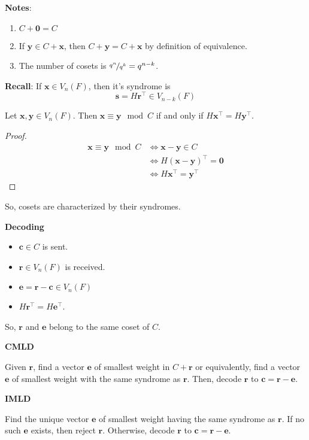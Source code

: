 \textbf{Notes}:
\begin{enumerate}[(1)]
    \item $ C+\bm{0}=C $
    \item If $ \bm{y}\in C+\bm{x} $, then $ C+\bm{y}=C+\bm{x} $ by definition
    of equivalence.
    \item The number of cosets is $ \nicefrac{q^n}{q^k}=q^{n-k} $.
\end{enumerate}

\textbf{Recall}: If $ \bm{x}\in V_n(F) $, then it's syndrome is
\[ \bm{s}=H\bm{r}^\top\in V_{n-k}(F) \]

\begin{thmbox}
    \begin{theorem}
        Let $ \bm{x},\bm{y}\in V_n(F) $. Then $ \bm{x}\equiv \bm{y}\mod C $
        if and only if $ H\bm{x}^\top=H\bm{y}^\top $.
    \end{theorem}
\end{thmbox}

\begin{proof}
    \begin{align*}
        \bm{x}\equiv \bm{y}\mod C
        &\iff \bm{x}-\bm{y}\in C\\
        &\iff H(\bm{x}-\bm{y})^\top=\bm{0}\\
        &\iff H\bm{x}^\top=\bm{y}^\top
    \end{align*}
\end{proof}
So, cosets are characterized by their syndromes.

\textbf{Decoding}
\begin{itemize}
    \item $ \bm{c}\in C $ is sent.
    \item $ \bm{r}\in V_n(F) $ is received.
    \item $ \bm{e}=\bm{r}-\bm{c}\in V_n(F) $
    \item $ H\bm{r}^\top=H\bm{e}^\top $.
\end{itemize}
So, $ \bm{r} $ and $ \bm{e} $ belong to the same coset of $ C $.

\textbf{CMLD}

Given $ \bm{r} $, find a vector $ \bm{e} $ of smallest weight in $ C+\bm{r} $
or equivalently, find a vector $ \bm{e} $ of smallest weight with the same
syndrome as $ \bm{r} $. Then, decode $ \bm{r} $ to $ \bm{c}=\bm{r}-\bm{e} $.

\textbf{IMLD}

Find the unique vector $ \bm{e} $ of smallest weight having the same syndrome
as $ \bm{r} $. If no such $ \bm{e} $ exists, then reject $ \bm{r} $.
Otherwise, decode $ \bm{r} $ to $ \bm{c}=\bm{r}-\bm{e} $.

